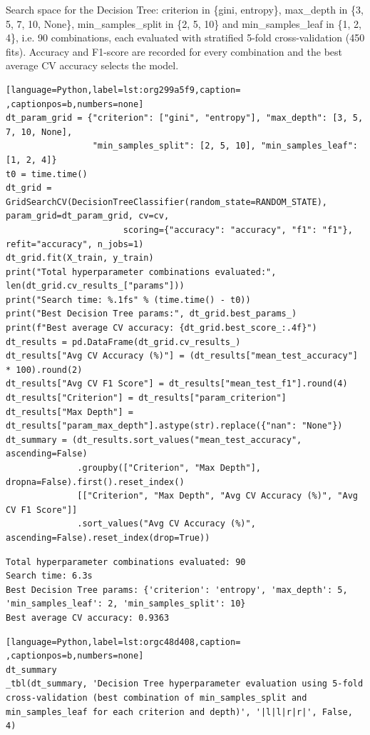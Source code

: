 \documentclass[11pt]{article}
\begin{document}
Search space for the Decision Tree: criterion in \{gini, entropy\}, max\_depth in \{3, 5, 7, 10,
None\}, min\_samples\_split in \{2, 5, 10\} and min\_samples\_leaf in \{1, 2, 4\}, i.e. 90
combinations, each evaluated with stratified 5-fold cross-validation (450 fits). Accuracy
and F1-score are recorded for every combination and the best average CV accuracy selects the
model.
\begin{lstlisting}[language=Python,label=lst:org299a5f9,caption= ,captionpos=b,numbers=none]
dt_param_grid = {"criterion": ["gini", "entropy"], "max_depth": [3, 5, 7, 10, None],
                 "min_samples_split": [2, 5, 10], "min_samples_leaf": [1, 2, 4]}
t0 = time.time()
dt_grid = GridSearchCV(DecisionTreeClassifier(random_state=RANDOM_STATE), param_grid=dt_param_grid, cv=cv,
                       scoring={"accuracy": "accuracy", "f1": "f1"}, refit="accuracy", n_jobs=1)
dt_grid.fit(X_train, y_train)
print("Total hyperparameter combinations evaluated:", len(dt_grid.cv_results_["params"]))
print("Search time: %.1fs" % (time.time() - t0))
print("Best Decision Tree params:", dt_grid.best_params_)
print(f"Best average CV accuracy: {dt_grid.best_score_:.4f}")
dt_results = pd.DataFrame(dt_grid.cv_results_)
dt_results["Avg CV Accuracy (%)"] = (dt_results["mean_test_accuracy"] * 100).round(2)
dt_results["Avg CV F1 Score"] = dt_results["mean_test_f1"].round(4)
dt_results["Criterion"] = dt_results["param_criterion"]
dt_results["Max Depth"] = dt_results["param_max_depth"].astype(str).replace({"nan": "None"})
dt_summary = (dt_results.sort_values("mean_test_accuracy", ascending=False)
              .groupby(["Criterion", "Max Depth"], dropna=False).first().reset_index()
              [["Criterion", "Max Depth", "Avg CV Accuracy (%)", "Avg CV F1 Score"]]
              .sort_values("Avg CV Accuracy (%)", ascending=False).reset_index(drop=True))
\end{lstlisting}

\begin{verbatim}
Total hyperparameter combinations evaluated: 90
Search time: 6.3s
Best Decision Tree params: {'criterion': 'entropy', 'max_depth': 5, 'min_samples_leaf': 2, 'min_samples_split': 10}
Best average CV accuracy: 0.9363
\end{verbatim}

\begin{lstlisting}[language=Python,label=lst:orgc48d408,caption= ,captionpos=b,numbers=none]
dt_summary
_tbl(dt_summary, 'Decision Tree hyperparameter evaluation using 5-fold cross-validation (best combination of min_samples_split and min_samples_leaf for each criterion and depth)', '|l|l|r|r|', False, 4)
\end{lstlisting}
\end{document}
